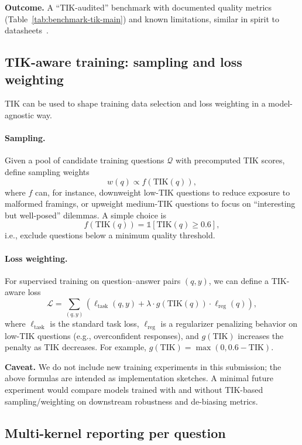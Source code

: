 \documentclass[11pt]{article}
\newcommand{\TIK}{\text{TIK}}
\begin{document}
\textbf{Outcome.} A “TIK-audited” benchmark with documented quality metrics (Table~\ref{tab:benchmark-tik-main}) and known limitations, similar in spirit to datasheets~\citep{gebru2021datasheets}.

\subsection{TIK-aware training: sampling and loss weighting}

TIK can be used to shape training data selection and loss weighting in a model-agnostic way.

\paragraph{Sampling.} Given a pool of candidate training questions $\mathcal{Q}$ with precomputed TIK scores, define sampling weights
\[
w(q) \propto f(\TIK(q)),
\]
where $f$ can, for instance, downweight low-TIK questions to reduce exposure to malformed framings, or upweight medium-TIK questions to focus on “interesting but well-posed” dilemmas. A simple choice is
\[
f(\TIK(q)) = \mathbb{1}[\TIK(q) \ge 0.6],
\]
i.e., exclude questions below a minimum quality threshold.

\paragraph{Loss weighting.} For supervised training on question–answer pairs $(q, y)$, we can define a TIK-aware loss
\[
\mathcal{L} = \sum_{(q,y)} \left( \ell_{\text{task}}(q, y) + \lambda \cdot g(\TIK(q)) \cdot \ell_{\text{reg}}(q) \right),
\]
where $\ell_{\text{task}}$ is the standard task loss, $\ell_{\text{reg}}$ is a regularizer penalizing behavior on low-TIK questions (e.g., overconfident responses), and $g(\TIK)$ increases the penalty as $\TIK$ decreases. For example, $g(\TIK) = \max(0, 0.6 - \TIK)$.

\textbf{Caveat.} We do not include new training experiments in this submission; the above formulas are intended as implementation sketches. A minimal future experiment would compare models trained with and without TIK-based sampling/weighting on downstream robustness and de-biasing metrics.

\subsection{Multi-kernel reporting per question}
\end{document}

